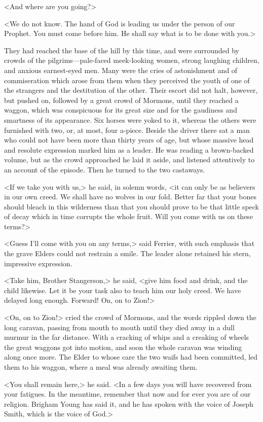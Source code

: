 <And where are you going?>

<We do not know. The hand of God is leading us under the person of our Prophet. You must come before him. He shall say what is to be done with you.>

They had reached the base of the hill by this time, and were surrounded by crowds of the pilgrims—pale-faced meek-looking women, strong laughing children, and anxious earnest-eyed men. Many were the cries of astonishment and of commiseration which arose from them when they perceived the youth of one of the strangers and the destitution of the other. Their escort did not halt, however, but pushed on, followed by a great crowd of Mormons, until they reached a waggon, which was conspicuous for its great size and for the gaudiness and smartness of its appearance. Six horses were yoked to it, whereas the others were furnished with two, or, at most, four a-piece. Beside the driver there sat a man who could not have been more than thirty years of age, but whose massive head and resolute expression marked him as a leader. He was reading a brown-backed volume, but as the crowd approached he laid it aside, and listened attentively to an account of the episode. Then he turned to the two castaways.

<If we take you with us,> he said, in solemn words, <it can only be as believers in our own creed. We shall have no wolves in our fold. Better far that your bones should bleach in this wilderness than that you should prove to be that little speck of decay which in time corrupts the whole fruit. Will you come with us on these terms?>

<Guess I'll come with you on any terms,> said Ferrier, with such emphasis that the grave Elders could not restrain a smile. The leader alone retained his stern, impressive expression.

<Take him, Brother Stangerson,> he said, <give him food and drink, and the child likewise. Let it be your task also to teach him our holy creed. We have delayed long enough. Forward! On, on to Zion!>

<On, on to Zion!> cried the crowd of Mormons, and the words rippled down the long caravan, passing from mouth to mouth until they died away in a dull murmur in the far distance. With a cracking of whips and a creaking of wheels the great waggons got into motion, and soon the whole caravan was winding along once more. The Elder to whose care the two waifs had been committed, led them to his waggon, where a meal was already awaiting them.

<You shall remain here,> he said. <In a few days you will have recovered from your fatigues. In the meantime, remember that now and for ever you are of our religion. Brigham Young has said it, and he has spoken with the voice of Joseph Smith, which is the voice of God.>